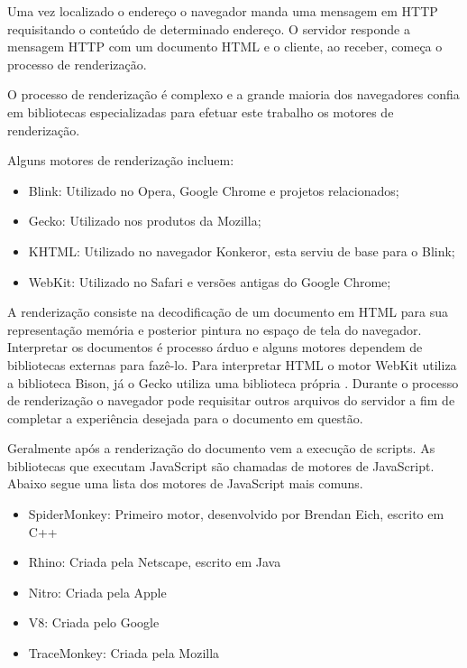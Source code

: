 Uma vez localizado o endereço o navegador manda uma mensagem em HTTP
requisitando o conteúdo de determinado endereço. O servidor responde a
mensagem HTTP com um documento HTML e o cliente, ao receber, começa o
processo de renderização.

O processo de renderização é complexo e a grande maioria dos
navegadores confia em bibliotecas especializadas para efetuar este
trabalho os motores de renderização.

Alguns motores de renderização incluem:

\begin{itemize}
    \item Blink: Utilizado no Opera, Google Chrome e projetos relacionados;
    \item Gecko: Utilizado nos produtos da Mozilla;
    \item KHTML: Utilizado no navegador Konkeror, esta serviu de base para o Blink;
    \item WebKit: Utilizado no Safari e versões antigas do Google Chrome;
\end{itemize}

A renderização consiste na decodificação de um documento em HTML
para sua representação memória e posterior pintura no espaço de tela
do navegador. Interpretar os documentos é processo árduo e alguns
motores dependem de bibliotecas externas para fazê-lo. Para interpretar
HTML o motor WebKit utiliza a biblioteca Bison, já o Gecko utiliza uma
biblioteca própria \autocite{howBrowsersWork}. Durante o processo de
renderização o navegador pode requisitar outros arquivos do servidor a
fim de completar a experiência desejada para o documento em questão.

Geralmente após a renderização do documento vem a execução de scripts.
As bibliotecas que executam JavaScript são chamadas de motores de JavaScript.
Abaixo segue uma lista dos motores de JavaScript mais comuns.

\begin{itemize}
    \item SpiderMonkey: Primeiro motor, desenvolvido por Brendan Eich, escrito em C++
    \item Rhino: Criada pela Netscape, escrito em Java
    \item Nitro: Criada pela Apple
    \item V8: Criada pelo Google
    \item TraceMonkey: Criada pela Mozilla
\end{itemize}

